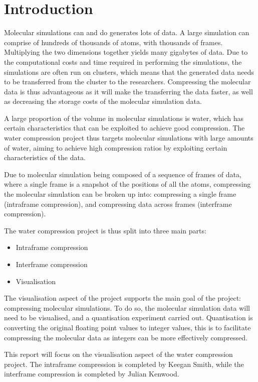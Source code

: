\chapter{Introduction}
\label{cha:introduction}

Molecular simulations can and do generates lots of data. A large simulation can
comprise of hundreds of thousands of atoms, with thousands of frames.
Multiplying the two dimensions together yields many gigabytes of data. Due to
the computational costs and time required in performing the simulations, the
simulations are often run on clusters, which means that the generated data needs
to be transferred from the cluster to the researchers. Compressing the molecular
data is thus advantageous as it will make the transferring the data faster, as
well as decreasing the storage costs of the molecular simulation data.

A large proportion of the volume in molecular simulations is water, which has
certain characteristics that can be exploited to achieve good compression. The
water compression project thus targets molecular simulations with large amounts
of water, aiming to achieve high compression ratios by exploiting certain
characteristics of the data.

Due to molecular simulation being composed of a sequence of frames of data,
where a single frame is a snapshot of the positions of all the atoms,
compressing the molecular simulation can be broken up into: compressing a
single frame (intraframe compression), and compressing data across frames
(interframe compression).

The water compression project is thus split into three main parts:

\begin{itemize}
  \item Intraframe compression
  \item Interframe compression
  \item Visualisation
\end{itemize}

The visualisation aspect of the project supports the main goal of the project:
compressing molecular simulations. To do so, the molecular simulation data will
need to be visualised, and a quantisation experiment carried out. Quantisation
is converting the original floating point values to integer values, this is to
facilitate compressing the molecular data as integers can be more effectively
compressed.

This report will focus on the visualisation aspect of the water compression
project. The intraframe compression is completed by Keegan Smith, while the
interframe compression is completed by Julian Kenwood.

